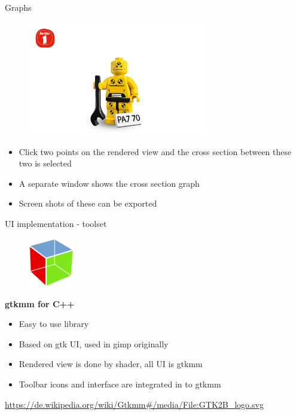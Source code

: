 \documentclass[shortpres,usenames,dvipsnames]{beamer}
\begin{document}
\begin{frame}[fragile]{Graphs}
	\begin{figure}
		\includegraphics[clip, width=80mm]{img/dummy_image.jpg}
	\end{figure}
	\begin{itemize}
		\item Click two points on the rendered view and the cross section between these two is selected
		\item A separate window shows the cross section graph
		\item Screen shots of these can be exported
	\end{itemize}
\end{frame}

\begin{frame}[fragile]{UI implementation - toolset}
	\begin{figure}
		\includegraphics[clip, width=20mm]{img/GTK_logo.png}
	\end{figure}
	\textbf{gtkmm for C++}
	\begin{itemize}
		\item Easy to use library 
		\item Based on gtk UI, used in gimp originally
		\item Rendered view is done by shader, all UI is gtkmm
		\item Toolbar icons and interface are integrated in to gtkmm 
	\end{itemize}
	\vfill
	\flushleft
	{\fontsize{5}{5} \selectfont \url{https://de.wikipedia.org/wiki/Gtkmm#/media/File:GTK2B_logo.svg}}
\end{frame}
	
\end{document}

